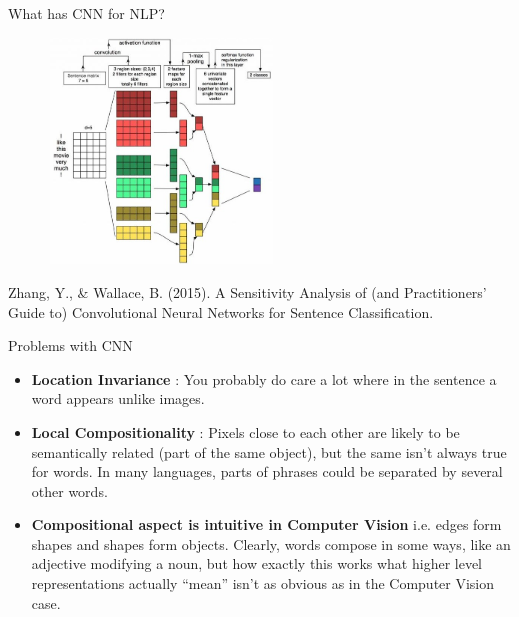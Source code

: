 \documentclass{beamer}
\begin{document}
\begin{frame}{What has CNN for NLP?}

\begin{figure}
    \centering
    \includegraphics[width=6cm, height=6cm]{cnn_nlp.jpg}
\end{figure}
    \tiny{Zhang, Y., & Wallace, B. (2015). A Sensitivity Analysis of (and Practitioners’ Guide to) Convolutional Neural Networks for Sentence Classification.}
\end{frame}

\begin{frame}{Problems with CNN}
\begin{itemize}
    \item \textbf{Location Invariance} : You probably do care a lot where in the sentence a word appears unlike images.
    
    \item \textbf{Local Compositionality} : Pixels close to each other are likely to be semantically related (part of the same object), but the same isn’t always true for words. In many languages, parts of phrases could be separated by several other words.
    
    \item \textbf{Compositional aspect is intuitive in Computer Vision} i.e. edges form shapes and shapes form objects. Clearly, words compose in some ways, like an adjective modifying a noun, but how exactly this works what higher level representations actually “mean” isn’t as obvious as in the Computer Vision case.
\end{itemize}
\end{frame}
\end{document}
